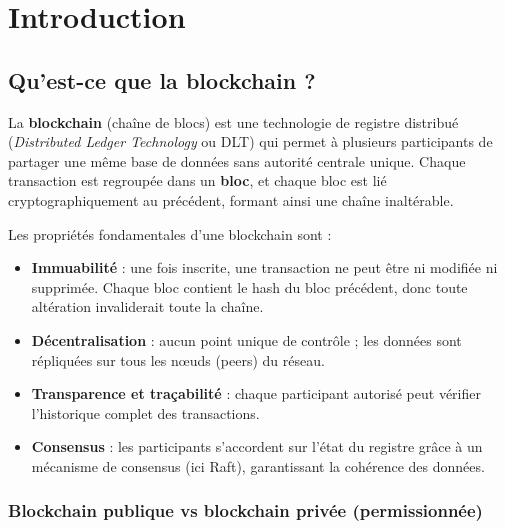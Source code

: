 \documentclass[12pt,a4paper,twoside]{report}
\begin{document}
\tableofcontents
\newpage

\chapter{Introduction}

\section{Qu'est-ce que la blockchain ?}

La \textbf{blockchain} (chaîne de blocs) est une technologie de registre distribué (\textit{Distributed Ledger Technology} ou DLT) qui permet à plusieurs participants de partager une même base de données sans autorité centrale unique. Chaque transaction est regroupée dans un \textbf{bloc}, et chaque bloc est lié cryptographiquement au précédent, formant ainsi une chaîne inaltérable.

\begin{infobox}
Les propriétés fondamentales d'une blockchain sont :
\begin{itemize}
    \item \textbf{Immuabilité} : une fois inscrite, une transaction ne peut être ni modifiée ni supprimée. Chaque bloc contient le hash du bloc précédent, donc toute altération invaliderait toute la chaîne.
    \item \textbf{Décentralisation} : aucun point unique de contrôle ; les données sont répliquées sur tous les nœuds (peers) du réseau.
    \item \textbf{Transparence et traçabilité} : chaque participant autorisé peut vérifier l'historique complet des transactions.
    \item \textbf{Consensus} : les participants s'accordent sur l'état du registre grâce à un mécanisme de consensus (ici Raft), garantissant la cohérence des données.
\end{itemize}
\end{infobox}

\subsection{Blockchain publique vs blockchain privée (permissionnée)}
\end{document}
